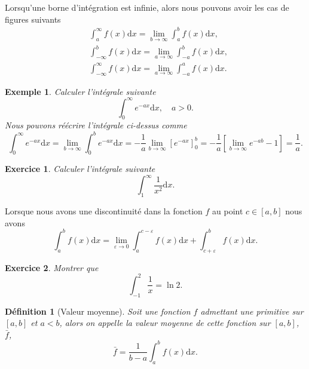 \documentclass[a4paper,12pt]{book}
\newcommand{\dd}{\mathrm{d}}
\newtheorem{definition}{Définition}
\newtheorem*{exemple}{Exemple}
\newtheorem*{exercice}{Exercice}
\begin{document}
Lorsqu'une borne d'intégration est infinie, alors nous pouvons avoir les cas de figures suivants
\begin{align}
 &\int_a^\infty f(x)\dd x=\lim\limits_{b\rightarrow\infty}\int_a^b f(x)\dd x,\\
 &\int_{-\infty}^b f(x)\dd x=\lim\limits_{a\rightarrow\infty}\int_{-a}^b f(x)\dd x,\\
 &\int_{-\infty}^\infty f(x)\dd x=\lim\limits_{a\rightarrow\infty}\int_{-a}^a f(x)\dd x.
\end{align}
\begin{exemple}
Calculer l'intégrale suivante
\begin{equation}
\int_0^\infty e^{-ax}\dd x,\quad a>0.
\end{equation}
Nous pouvons réécrire l'intégrale ci-dessus comme
\begin{equation*}
\int_0^\infty e^{-ax}\dd x=\lim\limits_{b\rightarrow \infty}\int_0^b e^{-ax}\dd x=-\frac{1}{a}\lim\limits_{b\rightarrow\infty}\left[e^{-ax}\right]_0^b=-\frac{1}{a}\left[\lim\limits_{b\rightarrow \infty}e^{-ab}-1\right]=\frac{1}{a}.
\end{equation*}
\end{exemple}
\begin{exercice}
 Calculer l'intégrale suivante
\begin{equation}
\int_1^\infty \frac{1}{x^2}\dd x.
\end{equation}
\end{exercice}

Lorsque nous avons une discontinuité dans la fonction $f$ au point $c\in[a,b]$ nous avons
\begin{equation}
 \int_a^b f(x)\dd x = \lim\limits_{\varepsilon\rightarrow 0}\int_a^{c-\varepsilon} f(x)\dd x +\int_{c+\varepsilon}^b f(x)\dd x.
\end{equation}
\begin{exercice}
 Montrer que 
\begin{equation}
 \int_{-1}^2\frac{1}{x}=\ln{2}.
\end{equation}

\end{exercice}




\begin{definition}[Valeur moyenne]
Soit une fonction $f$ admettant une primitive sur $[a,b]$ et $a<b$, alors on appelle
la valeur moyenne de cette fonction sur $[a,b]$, $\bar{f}$, 
\begin{equation}
\bar{f}=\frac{1}{b-a}\int_a^bf(x)\dd x.
\end{equation}

\end{definition}
\end{document}
